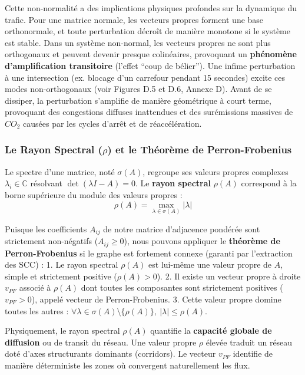 \documentclass[10pt, a4paper]{article}
\begin{document}
Cette non-normalité a des implications physiques profondes sur la
dynamique du trafic. Pour une matrice normale, les vecteurs propres
forment une base orthonormale, et toute perturbation décroît de manière
monotone si le système est stable. Dans un système non-normal, les
vecteurs propres ne sont plus orthogonaux et peuvent devenir presque
colinéaires, provoquant un \textbf{phénomène d'amplification
transitoire} (l'effet ``coup de bélier''). Une infime perturbation à une
intersection (ex. blocage d'un carrefour pendant 15 secondes) excite ces
modes non-orthogonaux (voir Figures D.5 et D.6, Annexe D). Avant de se
dissiper, la perturbation s'amplifie de manière géométrique à court
terme, provoquant des congestions diffuses inattendues et des
surémissions massives de \(CO_2\) causées par les cycles d'arrêt et de
réaccélération.

\subsubsection{\texorpdfstring{Le Rayon Spectral (\(\rho\)) et le
Théorème de
Perron-Frobenius}{Le Rayon Spectral (\textbackslash rho) et le Théorème de Perron-Frobenius}}\label{le-rayon-spectral-rho-et-le-thuxe9oruxe8me-de-perron-frobenius}

Le spectre d'une matrice, noté \(\sigma(A)\), regroupe ses valeurs
propres complexes \(\lambda_i \in \mathbb{C}\) résolvant
\(\det(\lambda I - A) = 0\). Le \textbf{rayon spectral} \(\rho(A)\)
correspond à la borne supérieure du module des valeurs propres :
\[\rho(A) = \max_{\lambda \in \sigma(A)} |\lambda|\]

Puisque les coefficients \(A_{ij}\) de notre matrice d'adjacence
pondérée sont strictement non-négatifs (\(A_{ij} \ge 0\)), nous pouvons
appliquer le \textbf{théorème de Perron-Frobenius} si le graphe est
fortement connexe (garanti par l'extraction des SCC) : 1. Le rayon
spectral \(\rho(A)\) est lui-même une valeur propre de \(A\), simple et
strictement positive (\(\rho(A) > 0\)). 2. Il existe un vecteur propre à
droite \(v_{PF}\) associé à \(\rho(A)\) dont toutes les composantes sont
strictement positives (\(v_{PF} > 0\)), appelé vecteur de
Perron-Frobenius. 3. Cette valeur propre domine toutes les autres :
\(\forall \lambda \in \sigma(A) \setminus \{\rho(A)\}, \ |\lambda| \le \rho(A)\).

Physiquement, le rayon spectral \(\rho(A)\) quantifie la
\textbf{capacité globale de diffusion} ou de transit du réseau. Une
valeur propre \(\rho\) élevée traduit un réseau doté d'axes structurants
dominants (corridors). Le vecteur \(v_{PF}\) identifie de manière
déterministe les zones où convergent naturellement les flux.
\end{document}
